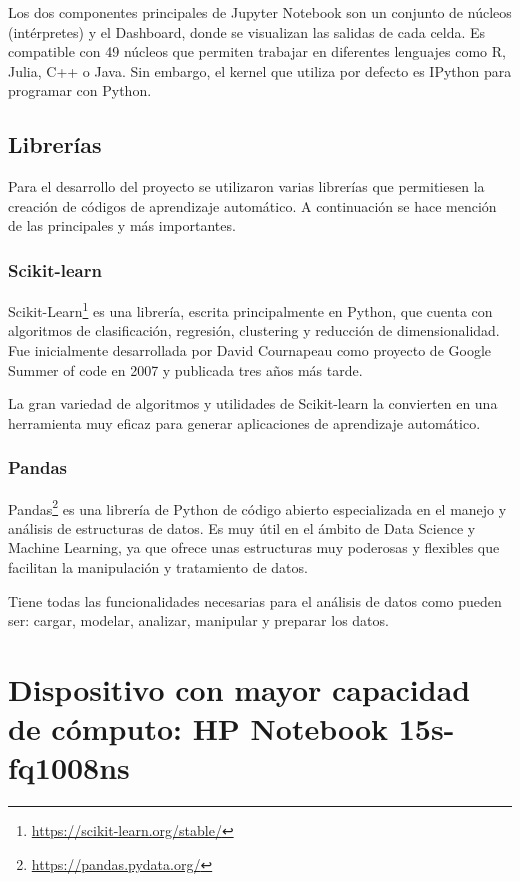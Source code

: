 \documentclass[a4paper, 12pt]{book}
\begin{document}
Los dos componentes principales de Jupyter Notebook son un conjunto de núcleos (intérpretes) y el Dashboard, donde se visualizan las salidas de cada celda. Es compatible con 49 núcleos que permiten trabajar en diferentes lenguajes como R, Julia, C++ o Java. Sin embargo, el kernel que utiliza por defecto es IPython para programar con Python. 

\subsection{Librerías}
\label{subsec:Librerías}
Para el desarrollo del proyecto se utilizaron varias librerías que permitiesen la creación de códigos de aprendizaje automático. A continuación se hace mención de las principales y más importantes.

\subsubsection{Scikit-learn}
\label{subsubsec:Scikit-learn}
Scikit-Learn\footnote{\url{https://scikit-learn.org/stable/}} es una librería, escrita principalmente en Python, que cuenta con algoritmos de clasificación, regresión, clustering y reducción de dimensionalidad. Fue inicialmente desarrollada por David Cournapeau como proyecto de Google Summer of code en 2007 y publicada tres años más tarde.

La gran variedad de algoritmos y utilidades de Scikit-learn la convierten en una herramienta muy eficaz para generar aplicaciones de aprendizaje automático.

\subsubsection{Pandas}
\label{subsubsec:Pandas}

Pandas\footnote{\url{https://pandas.pydata.org/}} es una librería de Python de código abierto especializada en el manejo y análisis de estructuras de datos. Es muy útil en el ámbito de Data Science y Machine Learning, ya que ofrece unas estructuras muy poderosas y flexibles que facilitan la manipulación y tratamiento de datos.

Tiene todas las funcionalidades necesarias para el análisis de datos como pueden ser: cargar, modelar, analizar, manipular y preparar los datos.


\section{Dispositivo con mayor capacidad de cómputo: HP Notebook 15s-fq1008ns}
\label{sec:portatil}
\end{document}
